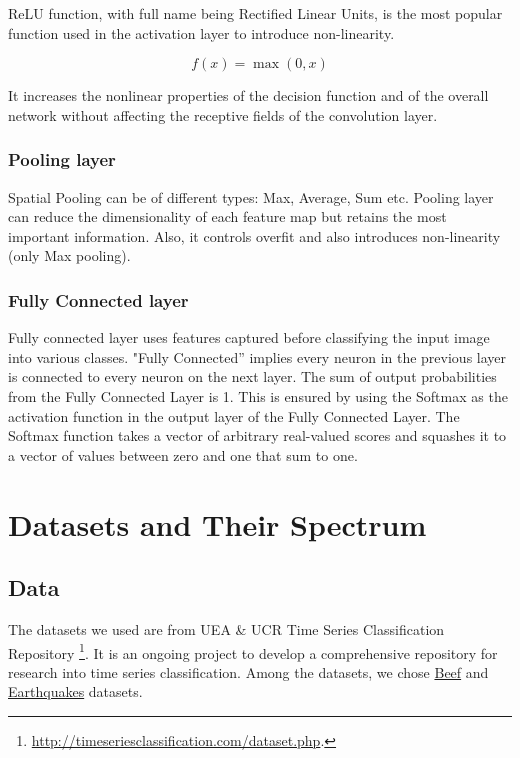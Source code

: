 \documentclass[letterpaper,12pt]{article}
\begin{document}
ReLU function, with full name being Rectified Linear Units, is the most popular function used in the activation layer to introduce non-linearity\cite{cs231n}.

\begin{equation} \label{eq:relu} 
f(x)=\max(0,x)
\end{equation}

It increases the nonlinear properties of the decision function and of the overall network without affecting the receptive fields of the convolution layer.

\subsubsection{Pooling layer}

Spatial Pooling can be of different types: Max, Average, Sum etc. Pooling layer can reduce the dimensionality of each feature map but retains the most important information. Also, it controls overfit and also introduces non-linearity (only Max pooling).

\subsubsection{Fully Connected layer}

Fully connected layer uses features captured before classifying the input image into various classes. "Fully Connected” implies every neuron in the previous layer is connected to every neuron on the next layer. The sum of output probabilities from the Fully Connected Layer is 1. This is ensured by using the Softmax as the activation function in the output layer of the Fully Connected Layer. The Softmax function takes a vector of arbitrary real-valued scores and squashes it to a vector of values between zero and one that sum to one.

\section{Datasets and Their Spectrum}
\label{sec-dataset}
\subsection{Data}
The datasets we used are from UEA \& UCR Time Series Classification Repository \footnote{\url{http://timeseriesclassification.com/dataset.php}.}. It is an ongoing project to develop a comprehensive repository for research into time series classification. Among the datasets, we chose \href{http://timeseriesclassification.com/description.php?Dataset=Beef}{Beef} and \href{http://timeseriesclassification.com/description.php?Dataset=Earthquakes}{Earthquakes} datasets. 
\end{document}
